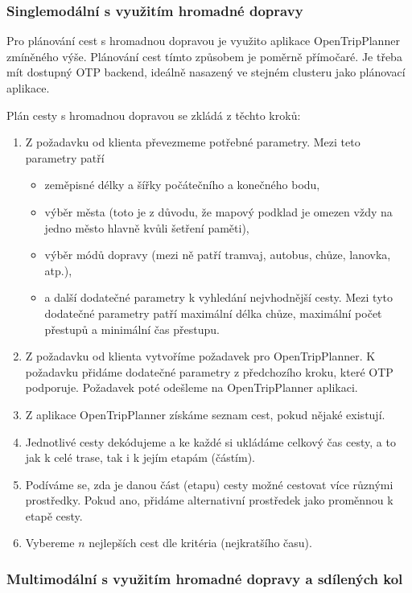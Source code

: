 \documentclass[thesis=M,czech]{FITthesis}[2019/12/23]
\theoremstyle{plain}
\theoremstyle{definition}
\begin{document}
\subsubsection{Singlemodální s využitím hromadné dopravy}

Pro plánování cest s hromadnou dopravou je využito aplikace OpenTripPlanner zmíněného výše. Plánování cest tímto způsobem je poměrně přímočaré. Je třeba mít dostupný OTP backend, ideálně nasazený ve stejném clusteru jako plánovací aplikace.


Plán cesty s hromadnou dopravou se zkládá z těchto kroků:

\begin{enumerate}
	\item Z požadavku od klienta převezmeme potřebné parametry. Mezi teto parametry patří
	\begin{itemize}
		\item zeměpisné délky a šířky počátečního a konečného bodu,
		\item výběr města (toto je z důvodu, že mapový podklad je omezen vždy na jedno město hlavně kvůli šetření paměti),
		\item výběr módů dopravy (mezi ně patří tramvaj, autobus, chůze, lanovka, atp.),
		\item a další dodatečné parametry k vyhledání nejvhodnější cesty. Mezi tyto dodatečné parametry patří maximální délka chůze, maximální počet přestupů a  minimální čas přestupu.
	\end{itemize}

	\item Z požadavku od klienta vytvoříme požadavek pro OpenTripPlanner. K požadavku přidáme dodatečné parametry z předchozího kroku, které OTP podporuje. Požadavek poté odešleme na OpenTripPlanner aplikaci. 
	\item Z aplikace OpenTripPlanner získáme seznam cest, pokud nějaké existují. 
	\item Jednotlivé cesty dekódujeme a ke každé si ukládáme celkový čas cesty, a to jak k celé trase, tak i k jejím etapám (částím). 
	\item Podíváme se, zda je danou část (etapu) cesty možné cestovat více různými prostředky. Pokud ano, přidáme alternativní prostředek jako proměnnou k etapě cesty.
	\item Vybereme $n$ nejlepších cest dle kritéria (nejkratšího času).
\end{enumerate}



\subsubsection{Multimodální s využitím hromadné dopravy a sdílených kol}
\end{document}
